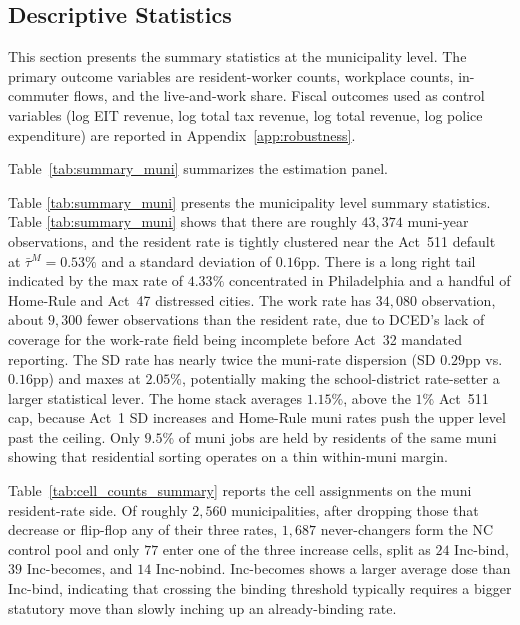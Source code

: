\documentclass[12pt]{article}
\begin{document}
\subsection{Descriptive Statistics}
\label{subsec:descriptive}

This section presents the summary statistics at the municipality
level. The primary outcome variables are resident-worker counts,
workplace counts, in-commuter flows, and the live-and-work share.
Fiscal outcomes used as control variables (log EIT revenue, log
total tax revenue, log total revenue, log police expenditure) are
reported in Appendix~\ref{app:robustness}.

Table~\ref{tab:summary_muni} summarizes the estimation panel.

% 



Table \ref{tab:summary_muni} presents the municipality level summary statistics. Table \ref{tab:summary_muni} shows that there are roughly $43{,}374$ muni-year observations, and the resident rate is tightly clustered
near the Act~511 default at $\bar{\tau}^{M}=0.53\%$ and a standard deviation of $0.16$pp. There is a long right tail indicated by the max rate of $4.33\%$ concentrated in Philadelphia and
a handful of Home-Rule and Act~47 distressed cities. The
work rate has $34{,}080$ observation, about $9{,}300$ fewer
observations than the resident rate, due to DCED's lack of coverage for the work-rate field being incomplete before Act~32 mandated
reporting. The SD rate has nearly twice the
muni-rate dispersion (SD $0.29$pp vs.\ $0.16$pp) and maxes at $2.05\%$, potentially making the school-district
rate-setter a larger statistical lever. The home stack averages
$1.15\%$, above the $1\%$ Act~511 cap, because Act~1 SD increases
and Home-Rule muni rates push the upper level past the ceiling.
Only $9.5\%$ of muni jobs are
held by residents of the same muni showing that residential sorting operates
on a thin within-muni margin.






Table~\ref{tab:cell_counts_summary} reports the cell
assignments on the muni resident-rate side. Of roughly $2{,}560$
municipalities, after dropping those that decrease or flip-flop any of
their three rates, $1{,}687$ never-changers form the NC control pool and
only $77$ enter one of the three increase cells, split as $24$ Inc-bind,
$39$ Inc-becomes, and $14$ Inc-nobind.
Inc-becomes shows a larger average
dose than Inc-bind, indicating that crossing the binding threshold typically
requires a bigger statutory move than slowly inching up an already-binding
rate.
\end{document}
